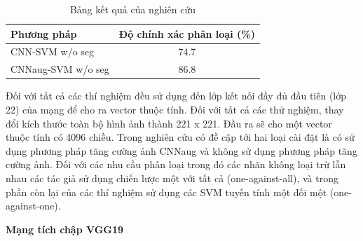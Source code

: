 \documentclass[12pt]{report}
\begin{document}
		\begin{table}[h]
			\centering
			\caption{Bảng kết quả của nghiên cứu \cite{cia-CNNFeatures off-the-shelf}}
			\label{tbl:table ket qua cua cnn_feature}
			\begin{tabular}{|l|c|}
				\hline
				\textbf{Phương pháp} & \textbf{Độ chính xác phân loại (\%)} \\ \hline
				CNN-SVM w/o seg         & 74.7                                         \\ \hline
				CNNaug-SVM w/o seg      & 86.8                                         \\ \hline
																																																																																												
			\end{tabular}
		\end{table}
																								
		Đối với tất cả các thí nghiệm đều sử dụng đến lớp kết nối đầy đủ đầu tiên (lớp 22) của mạng để cho ra vector thuộc tính. Đối với tất cả các thử nghiệm, thay đổi kích thước toàn bộ hình ảnh thành 221 x 221. Đầu ra sẽ cho một vector thuộc tính có 4096 chiều. Trong nghiên cứu có đề cập tới hai loại cài đặt là có sử dụng phương pháp tăng cường ảnh CNNaug và không sử dụng phương pháp tăng cường ảnh. Đối với các nhu cầu phân loại trong đó các nhãn không loại trừ lẫn nhau các tác giả sử dụng chiến lược một với tất cả (one-against-all), và trong phần còn lại của các thí nghiệm sử dụng các SVM tuyến tính một đối một (one-against-one).
																								
																								
		\textbf{Mạng tích chập VGG19 \cite{cia_vgg19}}
																										
\end{document}

